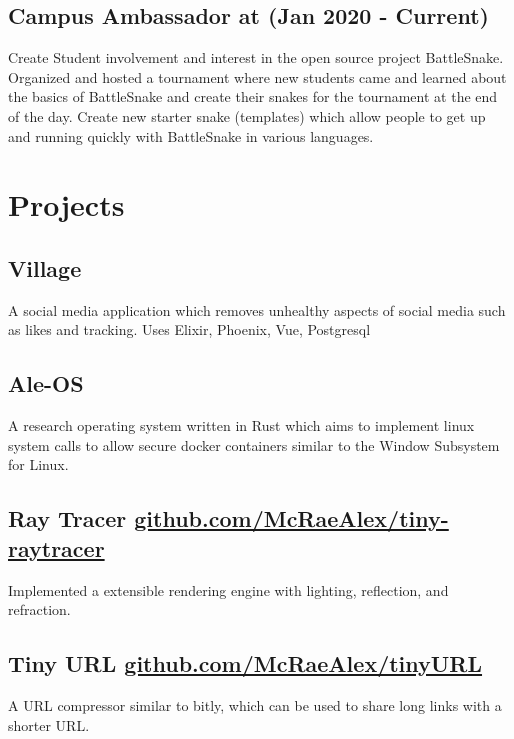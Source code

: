 \documentclass{article}
\newcommand{\hrefColored}[3]{\href{#2}{\color{#1}{#3}}}
\begin{document}
\subsection{Campus Ambassador at \hrefColored{blue}{https://github.com/McRaeAlex/AdventOfCode2018}{BattleSnake} (Jan 2020 - Current)}

Create Student involvement and interest in the open source project BattleSnake.
Organized and hosted a tournament where new students came and learned about the 
basics of BattleSnake and create their snakes for the tournament at the end of
the day. Create new starter snake (templates) which allow people to get up and 
running quickly with BattleSnake in various languages.

\section{Projects}

\subsection{Village}

A social media application which removes unhealthy aspects of social media such as likes and tracking. Uses Elixir, Phoenix, Vue, Postgresql

\subsection{Ale-OS}

A research operating system written in Rust which aims to implement linux system calls to allow secure docker containers similar to the Window Subsystem for Linux.

\subsection{Ray Tracer \href{https://github.com/McRaeAlex/tiny-raytracer}{github.com/McRaeAlex/tiny-raytracer}}

Implemented a extensible rendering engine with lighting, reflection, and 
refraction.

\subsection{Tiny URL \href{https://github.com/McRaeAlex/tinyURL}{github.com/McRaeAlex/tinyURL}}

A URL compressor similar to bitly, which can be used to share long links with a 
shorter URL.
\end{document}
